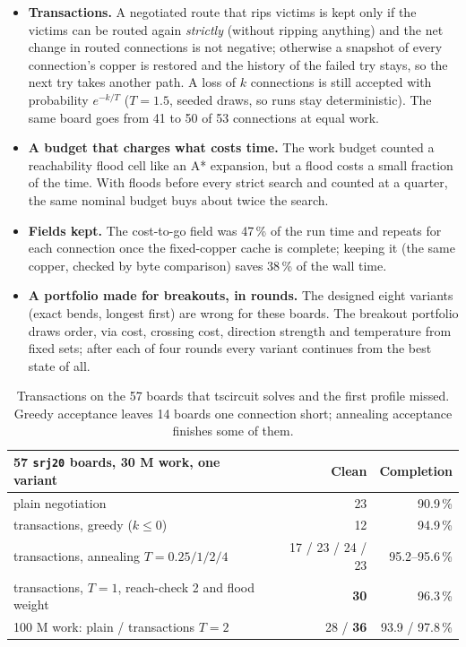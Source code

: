 \documentclass[10pt,a4paper]{article}
\begin{document}
\begin{itemize}[leftmargin=*]
  \item \textbf{Transactions.} A negotiated route that rips victims is kept only if the victims can be routed again \emph{strictly} (without ripping
  anything) and the net change in routed connections is not negative; otherwise a snapshot of every connection's copper is restored and the history
  of the failed try stays, so the next try takes another path. A loss of $k$ connections is still accepted with probability $e^{-k/T}$ ($T=1.5$,
  seeded draws, so runs stay deterministic). The same board goes from 41 to 50 of 53 connections at equal work.
  \item \textbf{A budget that charges what costs time.} The work budget counted a reachability flood cell like an A* expansion, but a flood costs a
  small fraction of the time. With floods before every strict search and counted at a quarter, the same nominal budget buys about twice the search.
  \item \textbf{Fields kept.} The cost-to-go field was 47\,\% of the run time and repeats for each connection once the fixed-copper cache is complete;
  keeping it (the same copper, checked by byte comparison) saves 38\,\% of the wall time.
  \item \textbf{A portfolio made for breakouts, in rounds.} The designed eight variants (exact bends, longest first) are wrong for these boards. The
  breakout portfolio draws order, via cost, crossing cost, direction strength and temperature from fixed sets; after each of four rounds every variant
  continues from the best state of all.
\end{itemize}

\begin{table}[h]
\centering
\small
\begin{tabular}{lrr}
\toprule
57 \texttt{srj20} boards, 30 M work, one variant & Clean & Completion \\
\midrule
plain negotiation & 23 & 90.9\,\% \\
transactions, greedy ($k\le 0$) & 12 & 94.9\,\% \\
transactions, annealing $T=0.25 / 1 / 2 / 4$ & 17 / 23 / 24 / 23 & 95.2--95.6\,\% \\
transactions, $T=1$, reach-check 2 and flood weight & \textbf{30} & 96.3\,\% \\
\midrule
100 M work: plain / transactions $T=2$ & 28 / \textbf{36} & 93.9 / 97.8\,\% \\
\bottomrule
\end{tabular}
\caption{Transactions on the 57 boards that tscircuit solves and the first profile missed. Greedy acceptance leaves 14 boards one connection short;
annealing acceptance finishes some of them.}
\label{tab:txn}
\end{table}
\end{document}
